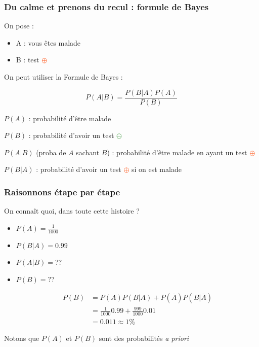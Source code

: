 \documentclass[usenames, dvipsnames]{beamer}
\begin{document}
\begin{frame}[plain]
\frametitle{Du calme et prenons du recul : formule de Bayes}

\pause

On pose :

\begin{itemize}
\item A : vous êtes malade
\item B : test \textcolor{OrangeRed}{$\oplus$}
\end{itemize}

\pause

On peut utiliser la \alert{Formule de Bayes} :

\[
P(A|B) = \frac{P(B|A)P(A)}{P(B)}
\]

\pause
$P(A)$ : probabilité d'être malade

$P(B)$ : probabilité d'avoir un test \textcolor{ForestGreen}{$\ominus$}\pause

$P(A|B)$ (proba de $A$ sachant $B$) : probabilité d'être malade en ayant un test \textcolor{OrangeRed}{$\oplus$}\pause

$P(B|A)$ : probabilité d'avoir un test \textcolor{OrangeRed}{$\oplus$} si on est malade \pause

\end{frame}

\begin{frame}[plain]
\frametitle{Raisonnons étape par étape}

On connaît quoi, dans toute cette histoire ?

\begin{itemize}
\item $P(A) = \frac{1}{1000}$ \pause
\item $P(B|A) = 0.99$ \pause
\item $P(A|B) = ??$ \pause
\item $P(B) = ??$ \pause

\begin{align*}P(B) &= P(A)P(B|A) + P(\bar{A})P(B|\bar{A})\\
&=\frac{1}{1000}0.99 + \frac{999}{1000}0.01\\
&= 0.011 \approx 1\%\end{align*}

\end{itemize}

Notons que $P(A)$ et $P(B)$ sont des probabilités \textit{a priori}

\end{frame}
\end{document}

